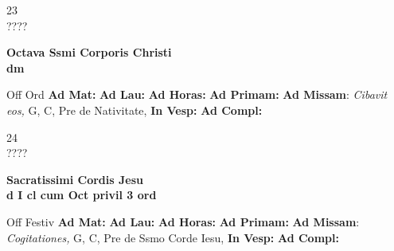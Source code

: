 \documentclass[10pt, openany]{book}
\begin{document}
    \begin{center}
        \begin{minipage}{3.5in}
            \vspace{2em}
            \begin{minipage}{0.5in}
                {\Huge 23} \\
                {\normalsize ????}
            \end{minipage}
            \begin{minipage}{3.0in}
                \textbf{ \large Octava Ssmi Corporis Christi \\
                \textnormal{\normalsize dm}}

            \end{minipage}
            \begin{justify}Off Ord
                \textbf{Ad Mat: }
                \textbf{Ad Lau: }
                \textbf{Ad Horas: }
                \textbf{Ad Primam: }\textbf{Ad Missam}: \textit{Cibavit eos,} G, C, Pre de Nativitate, 
                \textbf{In Vesp: }
                \textbf{Ad Compl: }
            \end{justify}
        \end{minipage}
    \end{center}

    \begin{center}
        \begin{minipage}{3.5in}
            \vspace{2em}
            \begin{minipage}{0.5in}
                {\Huge 24} \\
                {\normalsize ????}
            \end{minipage}
            \begin{minipage}{3.0in}
                \textbf{ \large Sacratissimi Cordis Jesu \\
                \textnormal{\normalsize d I cl cum Oct privil 3 ord}}

            \end{minipage}
            \begin{justify}Off Festiv
                \textbf{Ad Mat: }
                \textbf{Ad Lau: }
                \textbf{Ad Horas: }
                \textbf{Ad Primam: }\textbf{Ad Missam}: \textit{Cogitationes,} G, C, Pre de Ssmo Corde Iesu, 
                \textbf{In Vesp: }
                \textbf{Ad Compl: }
            \end{justify}
        \end{minipage}
    \end{center}
\end{document}
